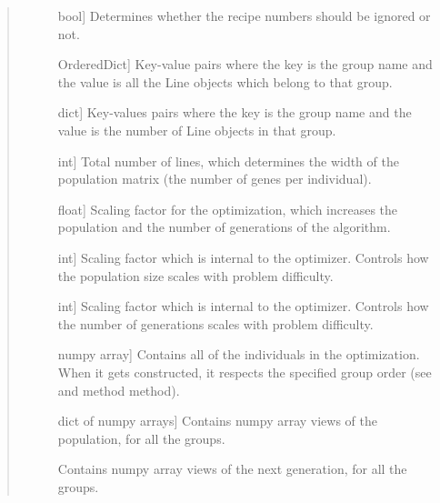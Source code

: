 \documentclass[letterpaper,10pt,english,openany,oneside]{sphinxmanual}
\begin{document}
\begin{fulllineitems}
\begin{quote}
\begin{description}
\begin{description}
\item[{}] \leavevmode{[}bool{]}
Determines whether the recipe numbers should be ignored or not.

\item[{}] \leavevmode{[}OrderedDict{]}
Key-value pairs where the key is the group name and the value is all
the Line objects which belong to that group.

\item[{}] \leavevmode{[}dict{]}
Key-values pairs where the key is the group name and the value is the
number of Line objects in that group.

\item[{}] \leavevmode{[}int{]}
Total number of lines, which determines the width of the population
matrix (the number of genes per individual).

\item[{}] \leavevmode{[}float{]}
Scaling factor for the optimization, which increases the population and
the number of generations of the algorithm.

\item[{}] \leavevmode{[}int{]}
Scaling factor which is internal to the optimizer. Controls how the
population size scales with problem difficulty.

\item[{}] \leavevmode{[}int{]}
Scaling factor which is internal to the optimizer. Controls how the
number of generations scales with problem difficulty.

\item[{}] \leavevmode{[}numpy array{]}
Contains all of the individuals in the optimization. When it gets
constructed, it respects the specified group order (see 
and  method method).

\item[{}] \leavevmode{[}dict of numpy arrays{]}
Contains numpy array views of the population, for all the groups.

\item[{}] \leavevmode
Contains numpy array views of the next generation, for all the groups.


\end{description}
\end{description}
\end{quote}
\end{fulllineitems}
\end{document}
